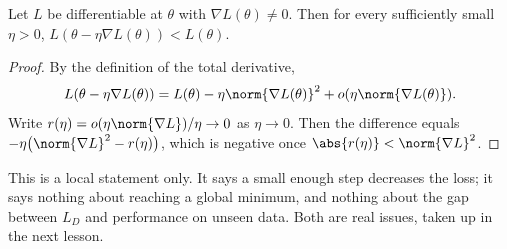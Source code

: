 \begin{proposition}\label{prop:descent}
Let $L$ be differentiable at $\theta$ with $\nabla L(\theta)\ne0$. Then for
every sufficiently small $\eta>0$,
$L(\theta-\eta\nabla L(\theta))<L(\theta)$.
\end{proposition}

\begin{proof}
By the definition of the total derivative,
\[
  L(\theta-\eta\nabla L(\theta))
  =L(\theta)-\eta\norm{\nabla L(\theta)}^2+o(\eta\norm{\nabla L(\theta)}).
\]
Write $r(\eta)=o(\eta\norm{\nabla L})/\eta\to0$ as $\eta\to0$. Then the
difference equals $-\eta\bigl(\norm{\nabla L}^2-r(\eta)\bigr)$, which is
negative once $\abs{r(\eta)}<\norm{\nabla L}^2$.
\end{proof}

This is a local statement only. It says a small enough step decreases the
loss; it says nothing about reaching a global minimum, and nothing about the
gap between $L_D$ and performance on unseen data. Both are real issues, taken up
in the next lesson.

